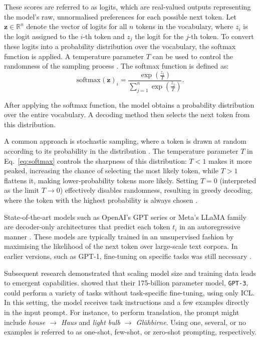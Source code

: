\documentclass[a4paper,oneside,bibliography=totoc]{scrbook}
\begin{document}
These scores are referred to as logits, which are real-valued outputs representing the model’s raw, unnormalised preferences for each possible next token. Let $\mathbf{z} \in \mathbb{R}^n$ denote the vector of logits for all $n$ tokens in the vocabulary, where $z_i$ is the logit assigned to the $i$-th token and $z_j$ the logit for the $j$-th token. To convert these logits into a probability distribution over the vocabulary, the softmax function is applied. \linebreak[4]A temperature parameter $T$ can be used to control the randomness of the sampling process \cite{Peeperkorn2024}. The softmax function is defined as:
\begin{equation}
  \label{eq:softmax}
  \mathrm{softmax}(\mathbf{z})_i = \frac{\exp\left(\frac{z_i}{T}\right)}{\sum_{j=1}^{n} \exp\left(\frac{z_j}{T}\right)}.
\end{equation}

After applying the softmax function, the model obtains a probability distribution over the entire vocabulary. A decoding method then selects the next token from this distribution.

A common approach is stochastic sampling, where a token is drawn at random according to its probability in the distribution \cite{Brown2020}. The temperature parameter $T$ in Eq.~\eqref{eq:softmax} controls the sharpness of this distribution: $T < 1$ makes it more peaked, increasing the chance of selecting the most likely token, while $T > 1$ flattens it, making lower-probability tokens more likely. Setting $T = 0$ (interpreted as the limit $T \to 0$) effectively disables randomness, resulting in greedy decoding, where the token with the highest probability is always chosen \cite{Peeperkorn2024}.

State-of-the-art models such as OpenAI’s \ac{GPT} series or Meta’s \ac{LLaMA} family are decoder-only architectures that predict each token $t_i$ in an autoregressive manner \cite{Radford2018,Grattafiori2024}. These models are typically trained in an unsupervised fashion by maximising the likelihood of the next token over large-scale text corpora. In earlier versions, such as GPT-1, fine-tuning on specific tasks was still necessary \cite{Radford2018}.

Subsequent research demonstrated that scaling model size and training data leads to emergent capabilities. \citet{Brown2020} showed that their 175-billion parameter model, \texttt{GPT-3}, could perform a variety of tasks without task-specific fine-tuning, using only \ac{ICL}. In this setting, the model receives task instructions and a few examples directly in the input prompt. For instance, to perform translation, the prompt might include \textit{house $\rightarrow$ Haus} and \textit{light bulb $\rightarrow$ Glühbirne}. Using one, several, or no examples is referred to as one-shot, few-shot, or zero-shot prompting, respectively.
\end{document}
